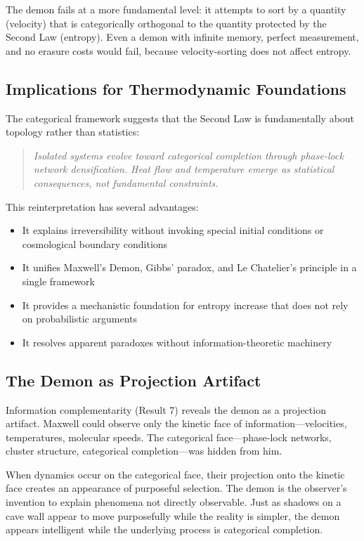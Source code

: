 The demon fails at a more fundamental level: it attempts to sort by a quantity (velocity) that is categorically orthogonal to the quantity protected by the Second Law (entropy). Even a demon with infinite memory, perfect measurement, and no erasure costs would fail, because velocity-sorting does not affect entropy.

\subsection{Implications for Thermodynamic Foundations}

The categorical framework suggests that the Second Law is fundamentally about topology rather than statistics:

\begin{quote}
\textit{Isolated systems evolve toward categorical completion through phase-lock network densification. Heat flow and temperature emerge as statistical consequences, not fundamental constraints.}
\end{quote}

This reinterpretation has several advantages:
\begin{itemize}
\item It explains irreversibility without invoking special initial conditions or cosmological boundary conditions
\item It unifies Maxwell's Demon, Gibbs' paradox, and Le Chatelier's principle in a single framework
\item It provides a mechanistic foundation for entropy increase that does not rely on probabilistic arguments
\item It resolves apparent paradoxes without information-theoretic machinery
\end{itemize}

\subsection{The Demon as Projection Artifact}

Information complementarity (Result 7) reveals the demon as a projection artifact. Maxwell could observe only the kinetic face of information---velocities, temperatures, molecular speeds. The categorical face---phase-lock networks, cluster structure, categorical completion---was hidden from him.

When dynamics occur on the categorical face, their projection onto the kinetic face creates an appearance of purposeful selection. The demon is the observer's invention to explain phenomena not directly observable. Just as shadows on a cave wall appear to move purposefully while the reality is simpler, the demon appears intelligent while the underlying process is categorical completion.

